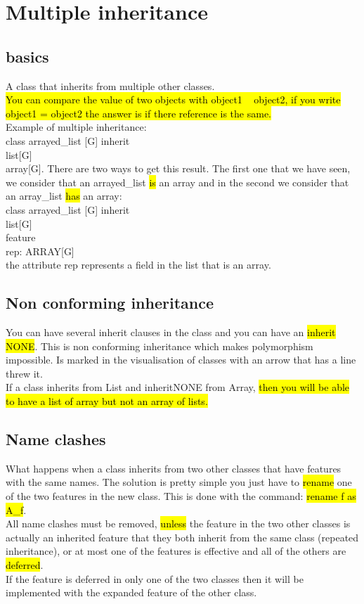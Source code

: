 \documentclass[11pt]{article}
\newcommand\tab[1][1cm]{\hspace*{#1}}
\begin{document}
\section{Multiple inheritance}
\subsection{basics}
A class that inherits from multiple other classes.\\\hl{You can compare the value of two objects with object1 ~ object2, if you write object1 = object2 the answer is if there reference is the same.}\\Example of multiple inheritance:\\class arrayed\_list [G] inherit\\\tab list[G]\\\tab array[G]. There are two ways to get this result. The first one that we have seen, we consider that an arrayed\_list \hl{is} an array and in the second we consider that an array\_list \hl{has} an array:\\class arrayed\_list [G] inherit\\\tab list[G]\\feature\\\tab rep: ARRAY[G]\\the attribute rep represents a field in the list that is an array.
\subsection{Non conforming inheritance}
You can have several inherit clauses in the class and you can have an \hl{inherit {NONE}}. This is non conforming inheritance which makes polymorphism impossible. Is marked in the visualisation of classes with an arrow that has a line threw it.\\ If a class inherits from List and inherit{NONE} from Array, \hl{then you will be able to have a list of array but not an array of lists.}
\subsection{Name clashes}
What happens when a class inherits from two other classes that have features with the same names. The solution is pretty simple you just have to \hl{rename} one of the two features in the new class. This is done with the command: \hl{rename f as A\_f}.\\All name clashes must be removed, \hl{unless} the feature in the two other classes is actually an inherited feature that they both inherit from the same class (repeated inheritance), or at most one of the features is effective and all of the others are \hl{deferred}.\\If the feature is deferred in only one of the two classes then it will be implemented with the expanded feature of the other class.
\end{document}
